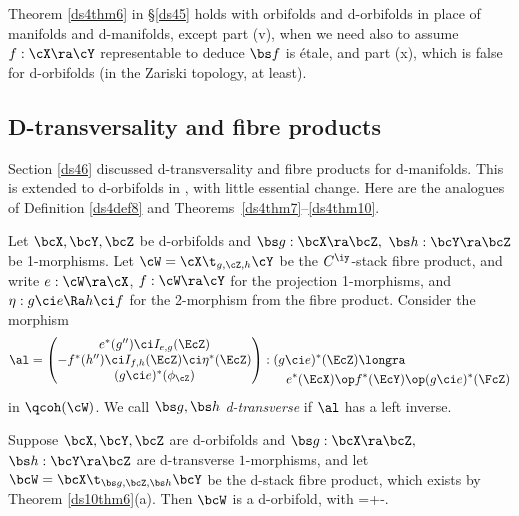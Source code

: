 \documentclass{article}
\begin{document}
Theorem \ref{ds4thm6} in \S\ref{ds45} holds with orbifolds and
d-orbifolds in place of manifolds and d-manifolds, except part (v),
when we need also to assume $f:\cX\ra\cY$
representable to deduce $\bs f$ is \'etale, and part (x), which is false for
d-orbifolds (in the Zariski topology, at
least).

\subsection{D-transversality and fibre products}
\label{ds115}

Section \ref{ds46} discussed d-transversality and fibre products for
d-manifolds. This is extended to d-orbifolds in \cite[\S
10.4]{Joyc6}, with little essential change. Here are the analogues
of Definition \ref{ds4def8} and
Theorems~\ref{ds4thm7}--\ref{ds4thm10}.

\begin{dfn} Let $\bcX,\bcY,\bcZ$ be d-orbifolds and $\bs
g:\bcX\ra\bcZ,$ $\bs h:\bcY\ra\bcZ$ be 1-morphisms. Let
$\cW=\cX\t_{g,\cZ,h}\cY$ be the $C^\iy$-stack fibre product, and
write $e:\cW\ra\cX$, $f:\cW\ra\cY$ for the projection 1-morphisms,
and $\eta:g\ci e\Ra h\ci f$ for the 2-morphism from the fibre
product. Consider the morphism
\begin{equation*}
\al=\begin{pmatrix} e^*(g'')\ci
I_{e,g}(\EcZ) \\ -f^*(h'')\ci I_{f,h}(\EcZ)\ci\eta^*(\EcZ) \\
(g\ci e)^*(\phi_\cZ)\end{pmatrix} :\begin{aligned}[t]
&(g\ci e)^*(\EcZ)\longra \\
&\quad e^*(\EcX)\op f^*(\EcY)\op (g\ci e)^*(\FcZ)\end{aligned}
\end{equation*}
in $\qcoh(\cW)$. We call $\bs g,\bs h$ {\it d-transverse\/} if $\al$
has a left inverse.
\label{ds11def3}
\end{dfn}

\begin{thm} Suppose\/ $\bcX,\bcY,\bcZ$ are d-orbifolds and\/ $\bs
g:\bcX\ra\bcZ,$ $\bs h:\bcY\ra\bcZ$ are d-transverse $1$-morphisms,
and let\/ $\bcW=\bcX\t_{\bs g,\bcZ,\bs h}\bcY$ be the d-stack fibre
product, which exists by Theorem\/ {\rm\ref{ds10thm6}(a)}. Then
$\bcW$ is a d-orbifold, with
\e
\vdim\bcW=\vdim\bcX+\vdim\bcY-\vdim\bcZ.
\label{ds11eq5}
\e
\label{ds11thm6}
\end{thm}
\end{document}
